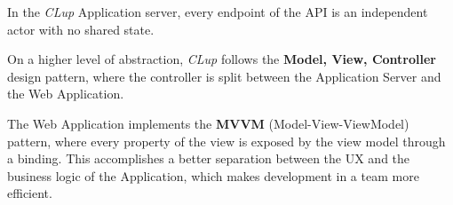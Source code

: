 In the \emph{CLup} Application server, every endpoint of the API is an independent actor with no shared state.

On a higher level of abstraction, \emph{CLup} follows the \textbf{Model, View, Controller} design pattern, where the controller is split between the Application Server and the Web Application.

The Web Application implements the \textbf{MVVM} (Model-View-ViewModel) pattern, where every property of the view is exposed by the view model through a binding. This accomplishes a better separation between the UX and the business logic of the Application, which makes development in a team more efficient.
